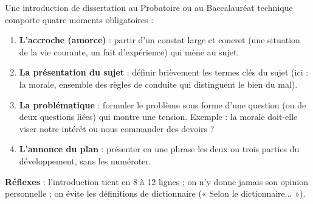 \documentclass[11pt]{article}
\newcommand{\cle}[1]{{\popxbold\color{popdark}#1}}
\begin{document}
\begin{methode}
Une introduction de dissertation au Probatoire ou au Baccalauréat technique comporte quatre moments obligatoires :
\begin{enumerate}
\item \textbf{L'accroche (amorce)} : partir d'un constat large et concret (une situation de la vie courante, un fait d'expérience) qui mène au sujet.
\item \textbf{La présentation du sujet} : définir brièvement les termes clés du sujet (ici : la \cle{morale}, ensemble des règles de conduite qui distinguent le bien du mal).
\item \textbf{La problématique} : formuler le problème sous forme d'une question (ou de deux questions liées) qui montre une tension. Exemple : la morale doit-elle viser notre intérêt ou nous commander des devoirs ?
\item \textbf{L'annonce du plan} : présenter en une phrase les deux ou trois parties du développement, sans les numéroter.
\end{enumerate}
\textbf{Réflexes} : l'introduction tient en 8 à 12 lignes ; on n'y donne jamais son opinion personnelle ; on évite les définitions de dictionnaire (« Selon le dictionnaire... »).
\end{methode}
\end{document}
